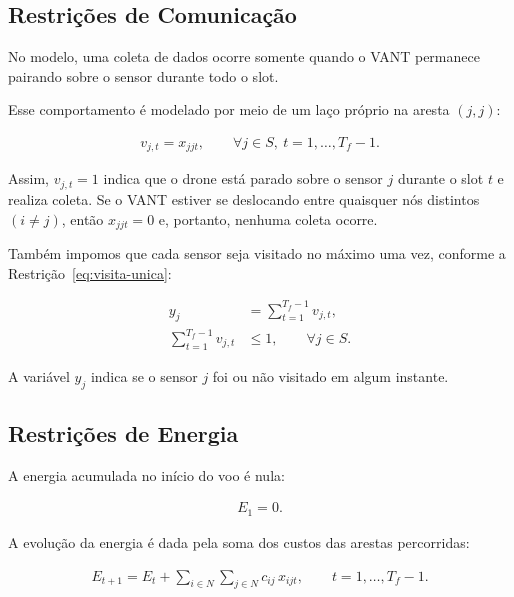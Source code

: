 \documentclass[
    12pt,
    oneside,
    a4paper,
    brazil
]{abntex2}
\begin{document}
    
    \subsection{Restrições de Comunicação}

    No modelo, uma coleta de dados ocorre somente quando o VANT permanece pairando sobre o sensor durante todo o slot.  
    
    Esse comportamento é modelado por meio de um laço próprio na aresta $(j,j)$:
    
    \begin{align}
        v_{j,t} = x_{j j t},
        \qquad \forall j \in S,\ t = 1,\ldots,T_f - 1.
        \label{eq:coleta}
    \end{align}
    
    Assim, $v_{j,t}=1$ indica que o drone está parado sobre o sensor $j$ durante o slot $t$ e realiza coleta.  
    Se o VANT estiver se deslocando entre quaisquer nós distintos $(i \ne j)$, então $x_{j j t} = 0$ e, portanto, nenhuma coleta ocorre.
    
    Também impomos que cada sensor seja visitado no máximo uma vez, conforme a Restrição~\eqref{eq:visita-unica}:

    \begin{align}
        y_j &= \sum_{t=1}^{T_f - 1} v_{j,t},
        \label{eq:y-visita}\\[4pt]
        \sum_{t=1}^{T_f - 1} v_{j,t} &\le 1,
        \qquad \forall j \in S.
        \label{eq:visita-unica}
    \end{align}
    
    A variável $y_j$ indica se o sensor $j$ foi ou não visitado em algum instante.
    
    \subsection{Restrições de Energia}
    
    A energia acumulada no início do voo é nula:
    
    \begin{align}
        E_1 = 0. \label{eq:energia-inicial}
    \end{align}
    
    A evolução da energia é dada pela soma dos custos das arestas percorridas:
    
    \begin{align}
        E_{t+1}
        =
        E_t
        +
        \sum_{i \in N}
        \sum_{j \in N}
            c_{ij}\, x_{ijt},
        \qquad t = 1,\ldots,T_f - 1.
        \label{eq:energia-evolucao}
    \end{align}
    
\end{document}
